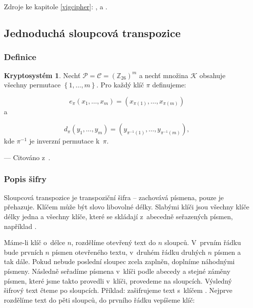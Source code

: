 \documentclass[12pt]{article}
\theoremstyle{definition}
\newtheorem{crypto}{Kryptosystém}
\newcommand{\cit}[1]{--- Citováno z~\cite{#1}.}
\newcommand{\setp}{\mathcal{P}}
\newcommand{\setc}{\mathcal{C}}
\newcommand{\setk}{\mathcal{K}}
\newcommand{\setz}{\mathbb{Z}}
\newcommand{\alp}{_{26}}
\begin{document}
Zdroje ke kapitole \ref{vigcipher}: \cite{singh}, \cite{cryptography} a \cite{vige}.









\subsection{Jednoduchá sloupcová transpozice}
\label{transcipher}
\subsubsection{Definice}
\begin{crypto}
Nechť $\setp=\setc=\left(\setz\alp\right)^m$ a nechť množina $\setk$ obsahuje všechny permutace $\left\{1,\ldots,m\right\}$. Pro každý klíč $\pi$ definujeme:

$$e_\pi\left(x_1,\ldots,x_m\right)=\left(x_{\pi(1)},\ldots,x_{\pi(m)}\right)$$
a

$$d_\pi\left(y_1,\ldots,y_m\right)=\left(y_{\pi^{-1}\left(1\right)},\ldots,y_{\pi^{-1}\left(m\right)}\right),$$
kde $\pi^{-1}$ je inverzní permutace k~$\pi$.
\end{crypto}

\cit{cryptography}

\subsubsection{Popis šifry}
Sloupcová transpozice je transpoziční šifra -- zachovává písmena, pouze je přehazuje. Klíčem může být slovo libovolné délky. Slabými klíči jsou všechny klíče délky jedna a všechny klíče, které se skládají z~abecedně seřazených písmen, například . 

Máme-li klíč o~délce $n$, rozdělíme otevřený text do $n$ sloupců. V~prvním řádku bude prvních $n$ písmen otevřeného textu, v~druhém řádku druhých $n$ písmen a tak dále. Pokud nebude poslední sloupec zcela zaplněn, doplníme náhodnými písmeny. Následně seřadíme písmena v~klíči podle abecedy a stejné záměny písmen, které jsme takto provedli v~klíči, provedeme na sloupcích. Výsledný šifrový text čteme po sloupcích. Příklad: zašifrujeme text  s~klíčem . Nejprve rozdělíme text do pěti sloupců, do prvního řádku vepíšeme klíč:
\end{document}
